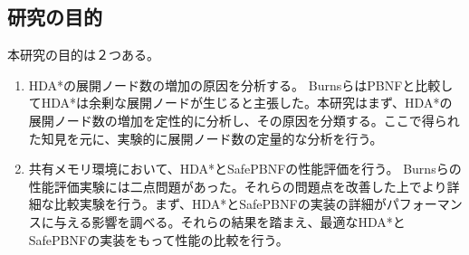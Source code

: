 \documentclass[uplatex]{jsarticle}
\begin{document}
\begin{comment}
BurnsらはマルチコアマシンでHDA*を含めた様々な並列アルゴリズムの性能比較を行い、その中でPBNFとHDA*を有望な(高速な)アルゴリズムとした。その上でPBNFはHDA*よりパフォーマンスに優れると結論をした。その理由として、PBNFがHDA*よりも探索ノード数が小さいという結果があったことを指摘した。しかしながら、Burnsらの比較実験には複数問題点がある。KishimotoらのHDA*の実装がZobrist Hash\cite{Zobrist1970}を用いていたのに対してBurnsらはNaiveなHash関数を用いている。Hash関数によってHDA*の性能は大きく異なると考えられるが、その違いは検証されていない。また、オープンリストをheapで実装しているが、これはBurnsらがベンチマーク問題として扱っている15 Puzzle、4 way Grid-pathfindingにおいて最適な実装ではない\cite{Burns2012implementing}。もう一つ重要な問題点として、ベンチマーク問題のサイズが小さいということが挙げられる。並列アルゴリズムは初期化に時間がかかる為、ある程度問題サイズが大きいものでないと実質的な高速化効率を正確に測ることが出来ない。Burnsらの用いた問題集はA*探索で10秒未満のものが多く、それらが十分な大きさであるかは検証の必要がある。
\newline

これらの理由から、HDA*とPBNFはより詳細な性能評価が必要であると考えられる。また、HDA*のHash関数による挙動の違いも重要な問題である。また、両アルゴリズムのオープンリストの実装がそれぞれどのような影響を与えるかも調査する必要がある。
\end{comment}

\subsection{研究の目的}

本研究の目的は２つある。

\begin{enumerate}
\item HDA*の展開ノード数の増加の原因を分析する。
\vspace{3mm}
\newline
BurnsらはPBNFと比較してHDA*は余剰な展開ノードが生じると主張した。本研究はまず、HDA*の展開ノード数の増加を定性的に分析し、その原因を分類する。ここで得られた知見を元に、実験的に展開ノード数の定量的な分析を行う。
\newline


\item 共有メモリ環境において、HDA*とSafePBNFの性能評価を行う。
\vspace{3mm}
\newline
Burnsらの性能評価実験には二点問題があった。それらの問題点を改善した上でより詳細な比較実験を行う。まず、HDA*とSafePBNFの実装の詳細がパフォーマンスに与える影響を調べる。それらの結果を踏まえ、最適なHDA*とSafePBNFの実装をもって性能の比較を行う。


\end{enumerate}
\end{document}
